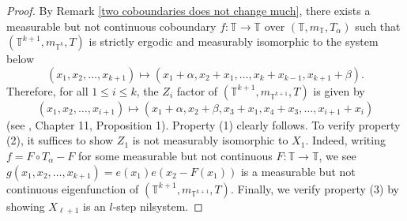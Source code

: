 \documentclass[12pt]{amsart}
\theoremstyle{definition}
\theoremstyle{plain}
\theoremstyle{definition}
\numberwithin{equation}{section}
\begin{document}
\begin{proof}
  By Remark \ref{two coboundaries does not change much}, there exists a measurable but not continuous coboundary $f\colon\mathbb{T} \rightarrow \mathbb{T}$ over $(\mathbb{T},m_{\mathbb{T}},T_{\alpha})$ such that $(\mathbb{T}^{k+1},m_{\mathbb{T}^k},T)$ is strictly ergodic and measurably isomorphic to the system below  $$(x_1,x_2,\dots,x_{k+1})\mapsto(x_1+\alpha,x_2+x_1,\dots,x_{k}+x_{k-1},x_{k+1}+\beta).$$ Therefore, for all $1 \leq i \leq k$, the $Z_i$ factor of $(\mathbb{T}^{k+1},m_{\mathbb{T}^{k+1}},T)$ is given by $$(x_1,x_2,\dots,x_{i+1})\longmapsto (x_1+\alpha,x_2+\beta,x_3+x_1,x_4+x_3,\dots,x_{i+1}+x_{i})$$ (see \cite{HK2}, Chapter 11, Proposition 1). Property (1) clearly follows.
  To verify property (2), it suffices to show $Z_1$ is not measurably isomorphic to $X_1$. Indeed, writing $f=F\circ T_{\alpha}-F$ for some measurable but not continuous $F\colon \mathbb{T} \rightarrow \mathbb{T}$, we see $g(x_1,x_2,\dots,x_{k+1})=e(x_1)e(x_2-F(x_1))$ is a measurable but not continuous eigenfunction of $(\mathbb{T}^{k+1},m_{\mathbb{T}^{k+1}},T)$. Finally, we verify property (3) by showing $X_{\ell+1}$ is an $l$-step nilsystem.


\end{proof}
\end{document}
